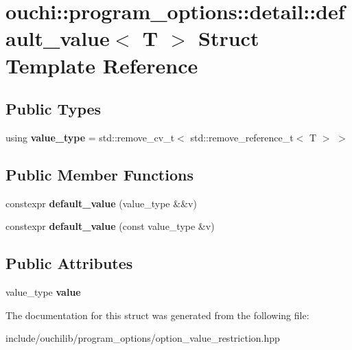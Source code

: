 \hypertarget{structouchi_1_1program__options_1_1detail_1_1default__value}{}\section{ouchi\+::program\+\_\+options\+::detail\+::default\+\_\+value$<$ T $>$ Struct Template Reference}
\label{structouchi_1_1program__options_1_1detail_1_1default__value}
\subsection*{Public Types}
\begin{DoxyCompactItemize}
\item 
\mbox{\label{structouchi_1_1program__options_1_1detail_1_1default__value_a07a15e86a1f0c5d78a7b063eef16c8f4}} 
using {\bfseries value\+\_\+type} = std\+::remove\+\_\+cv\+\_\+t$<$ std\+::remove\+\_\+reference\+\_\+t$<$ T $>$ $>$
\end{DoxyCompactItemize}
\subsection*{Public Member Functions}
\begin{DoxyCompactItemize}
\item 
\mbox{\label{structouchi_1_1program__options_1_1detail_1_1default__value_a4577a9f5b1a2a1ec2864845b2b61e27c}} 
constexpr {\bfseries default\+\_\+value} (value\+\_\+type \&\&v)
\item 
\mbox{\label{structouchi_1_1program__options_1_1detail_1_1default__value_ac043f7287c28070b350e36b32f7e70d1}} 
constexpr {\bfseries default\+\_\+value} (const value\+\_\+type \&v)
\end{DoxyCompactItemize}
\subsection*{Public Attributes}
\begin{DoxyCompactItemize}
\item 
\mbox{\label{structouchi_1_1program__options_1_1detail_1_1default__value_ae07c11f4c0cd1c9fe2e7fa0fc08824c6}} 
value\+\_\+type {\bfseries value}
\end{DoxyCompactItemize}


The documentation for this struct was generated from the following file\+:\begin{DoxyCompactItemize}
\item 
include/ouchilib/program\+\_\+options/option\+\_\+value\+\_\+restriction.\+hpp\end{DoxyCompactItemize}
